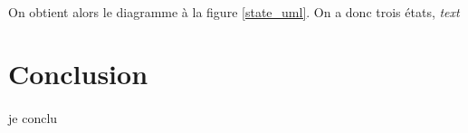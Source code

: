 \documentclass[a4paper]{article}
\begin{document}
			\paragraph{}{
			On obtient alors le diagramme à la figure \ref{state_uml}. On a donc trois états, \textit{text}
			}
	\newpage

	\section*{Conclusion}
		\paragraph{}{je conclu}
\end{document}
